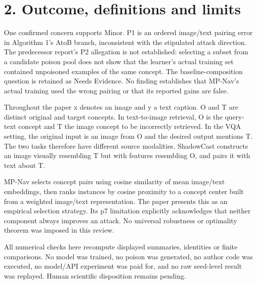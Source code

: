 \documentclass[10pt]{article}
\begin{document}
\section*{2. Outcome, definitions and limits}
One confirmed concern supports Minor. P1 is an ordered image/text pairing error in Algorithm 1’s AtoB branch, inconsistent with the stipulated attack direction. The predecessor report’s P2 allegation is not established: selecting a subset from a candidate poison pool does not show that the learner’s actual training set contained unpoisoned examples of the same concept. The baseline-composition question is retained as Needs Evidence. No finding establishes that MP-Nav’s actual training used the wrong pairing or that its reported gains are false.\par
Throughout the paper x denotes an image and y a text caption. O and T are distinct original and target concepts. In text-to-image retrieval, O is the query-text concept and T the image concept to be incorrectly retrieved. In the VQA setting, the original input is an image from O and the desired output mentions T. The two tasks therefore have different source modalities. ShadowCast constructs an image visually resembling T but with features resembling O, and pairs it with text about T.\par
MP-Nav selects concept pairs using cosine similarity of mean image/text embeddings, then ranks instances by cosine proximity to a concept center built from a weighted image/text representation. The paper presents this as an empirical selection strategy. Its p7 limitation explicitly acknowledges that neither component always improves an attack. No universal robustness or optimality theorem was imposed in this review.\par
All numerical checks here recompute displayed summaries, identities or finite comparisons. No model was trained, no poison was generated, no author code was executed, no model/API experiment was paid for, and no raw seed-level result was replayed. Human scientific disposition remains pending.\par
\end{document}
